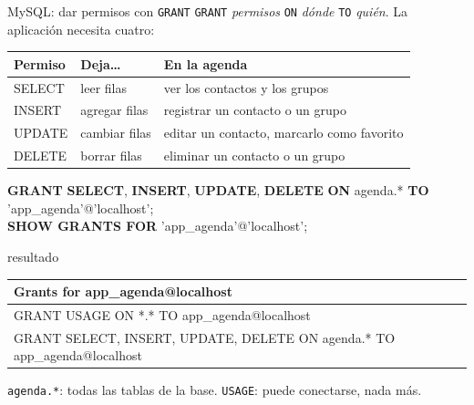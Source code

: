 \documentclass[aspectratio=169,10pt,c]{beamer}
\newcommand{\kw}[1]{\textcolor{utpRojo}{\textbf{#1}}}
\newcommand{\gris}[1]{\textcolor{utpGris}{#1}}
\newcommand{\dentro}[1]{{\setlength{\fboxsep}{1.5pt}\colorbox{yellow!45}{#1}}}
\newenvironment{sqlchico}[1][.86\textwidth]
  {\begin{center}\begin{lrbox}{\sqlbuf}\begin{minipage}{#1}\ttfamily\scriptsize\vspace{5pt}\raggedright}
  {\vspace{5pt}\end{minipage}\end{lrbox}\colorbox{utpGrisClaro}{\usebox{\sqlbuf}}\end{center}}
\newcommand{\cab}[1]{\normalfont\bfseries #1}
\newcommand{\bq}{\textasciigrave{}}
\begin{document}
\begin{frame}{MySQL: dar permisos con \texttt{GRANT}}
\small \texttt{GRANT} \textit{permisos} \texttt{ON} \textit{dónde} \texttt{TO} \textit{quién}. La aplicación necesita cuatro:
\vspace{0.05cm}
\begin{center}
\footnotesize
\renewcommand{\arraystretch}{1.2}
\begin{tabular}{@{}>{\ttfamily}l>{\raggedright}p{2.6cm}>{\raggedright\arraybackslash}p{6cm}@{}}
\toprule
\normalfont\bfseries Permiso & \bfseries Deja\ldots & \bfseries En la agenda \\
\midrule
SELECT & leer filas & ver los contactos y los grupos \\
INSERT & agregar filas & registrar un contacto o un grupo \\
UPDATE & cambiar filas & editar un contacto, marcarlo como favorito \\
DELETE & borrar filas & eliminar un contacto o un grupo \\
\bottomrule
\end{tabular}
\end{center}
\vspace{-0.1cm}
\begin{sqlchico}[.97\textwidth]
\kw{GRANT} \dentro{\kw{SELECT}, \kw{INSERT}, \kw{UPDATE}, \kw{DELETE}} \kw{ON} \dentro{agenda.*} \kw{TO} 'app\_agenda'@'localhost';\\[3pt]
\kw{SHOW GRANTS FOR} 'app\_agenda'@'localhost';
\end{sqlchico}
\vspace{-0.05cm}
\begin{center}
{\scriptsize\color{utpGris}resultado}\\[2pt]
{\fontsize{6.5}{7.8}\selectfont\ttfamily
\begin{tabular}{@{}l@{}}
\toprule
\cab{Grants for app\_agenda@localhost} \\
\midrule
GRANT USAGE ON *.* TO \bq app\_agenda\bq @\bq localhost\bq \\
GRANT SELECT, INSERT, UPDATE, DELETE ON \bq agenda\bq .* TO \bq app\_agenda\bq @\bq localhost\bq \\
\bottomrule
\end{tabular}\par}
\vspace{2pt}
{\scriptsize\gris{\texttt{agenda.*}: todas las tablas de la base. \texttt{USAGE}: puede conectarse, nada más.}\par}
\end{center}
\end{frame}
\end{document}
